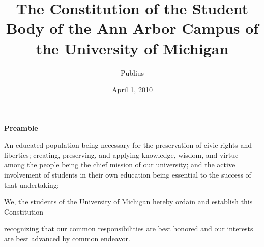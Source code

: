 \documentclass{constitution}
\begin{document}
	\title{The Constitution of the Student Body of the Ann Arbor Campus of the University of Michigan}
	\author{Publius}
	\date{April 1, 2010}
	\maketitle
	\tableofcontents
	\newpage

	\pagestyle{fancy}
	\headheight 35pt
	\thispagestyle{empty}
	\linenumbers
	
	\begin{center}
		\bfseries Preamble
	\end{center}

	An educated population being necessary for the preservation of civic rights
	and liberties; creating, preserving, and applying knowledge, wisdom, and
	virtue among the people being the chief mission of our university; and the
	active involvement of students in their own education being essential to
	the success of that undertaking;

		We, the students of the University of Michigan hereby ordain and establish
	this Constitution

	recognizing that our common responsibilities are best honored and our
	interests are best advanced by common endeavor.
	

	

	
	
	
	
	
	
	
	
	
\end{document}
